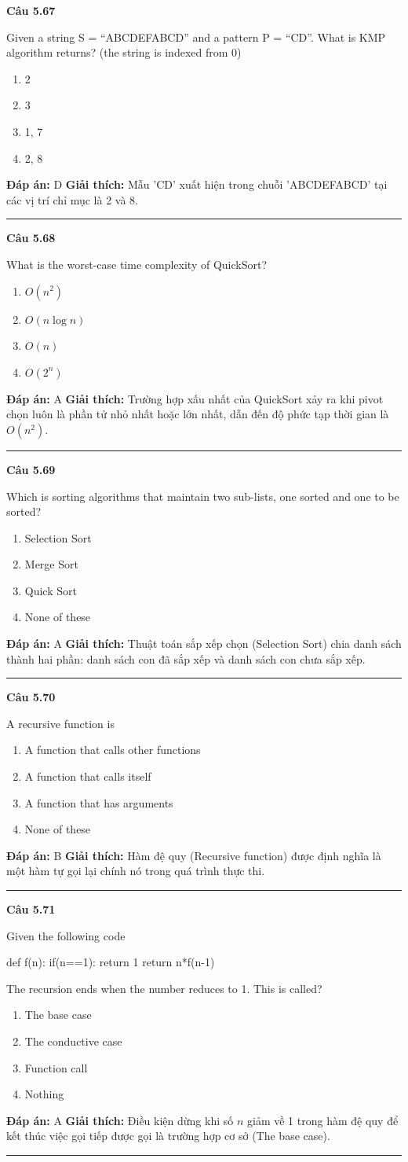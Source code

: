 \documentclass[11pt,a4paper]{article}
\newenvironment{question}[1]{%
  \par\vspace{1em}\noindent\textbf{\large Câu #1}\par\vspace{0.4em}
}{%
  \par\vspace{1em}\hrule\vspace{0.6em}
}
\newenvironment{choices}{%
  \begin{enumerate}[label=\textbf{\Alph*.},leftmargin=2.2em,itemsep=2pt,topsep=3pt]
}{%
  \end{enumerate}
}
\newcommand{\choice}{\item}
\newenvironment{codebox}{%
  \begin{tcolorbox}[colback=gray!8!white,colframe=gray!50!black,arc=1.5mm,boxrule=0.6pt,left=3mm,right=3mm,top=2.5mm,bottom=2.5mm]
  \ttfamily\small
}{%
  \end{tcolorbox}
}
\begin{document}
\begin{question}{5.67}
Given a string S = ``ABCDEFABCD'' and a pattern P = ``CD''. What is KMP algorithm returns? (the string is indexed from 0)
\begin{choices}
\choice 2
\choice 3
\choice 1, 7
\choice 2, 8
\end{choices}
\textbf{Đáp án:} D
\textbf{Giải thích:} Mẫu 'CD' xuất hiện trong chuỗi 'ABCDEFABCD' tại các vị trí chỉ mục là 2 và 8.
\end{question}

\begin{question}{5.68}
What is the worst-case time complexity of QuickSort?
\begin{choices}
\choice $O(n^2)$
\choice $O(n \log n)$
\choice $O(n)$
\choice $O(2^n)$
\end{choices}
\textbf{Đáp án:} A
\textbf{Giải thích:} Trường hợp xấu nhất của QuickSort xảy ra khi pivot chọn luôn là phần tử nhỏ nhất hoặc lớn nhất, dẫn đến độ phức tạp thời gian là $O(n^2)$.
\end{question}

\begin{question}{5.69}
Which is sorting algorithms that maintain two sub-lists, one sorted and one to be sorted?
\begin{choices}
\choice Selection Sort
\choice Merge Sort
\choice Quick Sort
\choice None of these
\end{choices}
\textbf{Đáp án:} A
\textbf{Giải thích:} Thuật toán sắp xếp chọn (Selection Sort) chia danh sách thành hai phần: danh sách con đã sắp xếp và danh sách con chưa sắp xếp.
\end{question}

\begin{question}{5.70}
A recursive function is
\begin{choices}
\choice A function that calls other functions
\choice A function that calls itself
\choice A function that has arguments
\choice None of these
\end{choices}
\textbf{Đáp án:} B
\textbf{Giải thích:} Hàm đệ quy (Recursive function) được định nghĩa là một hàm tự gọi lại chính nó trong quá trình thực thi.
\end{question}

\begin{question}{5.71}
Given the following code
\begin{codebox}
def f(n):
    if(n==1):
        return 1
    return n*f(n-1)
\end{codebox}
The recursion ends when the number reduces to 1. This is called?
\begin{choices}
\choice The base case
\choice The conductive case
\choice Function call
\choice Nothing
\end{choices}
\textbf{Đáp án:} A
\textbf{Giải thích:} Điều kiện dừng khi số $n$ giảm về 1 trong hàm đệ quy để kết thúc việc gọi tiếp được gọi là trường hợp cơ sở (The base case).
\end{question}
\end{document}
